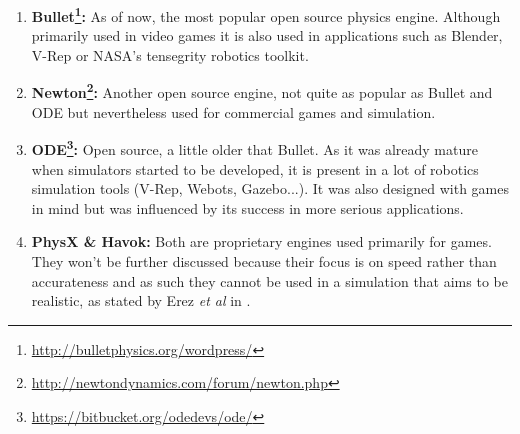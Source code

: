 \begin{enumerate}
\item \textbf{Bullet\footnote{\url{http://bulletphysics.org/wordpress/}}:} As of now, the most popular open source physics engine. Although primarily used in video games it is also used in applications such as Blender, V-Rep or NASA's tensegrity robotics toolkit. 

\item \textbf{Newton\footnote{\url{http://newtondynamics.com/forum/newton.php}}:} Another open source engine, not quite as popular as Bullet and ODE but nevertheless used for commercial games and simulation. 

\item \textbf{ODE\footnote{\url{https://bitbucket.org/odedevs/ode/}}:} Open source, a little older that Bullet. As it was already mature when simulators started to be developed, it is present in a lot of robotics simulation tools (V-Rep, Webots, Gazebo...). It was also designed with games in mind but was influenced by its success in more serious applications.

\item \textbf{PhysX \& Havok:} Both are proprietary engines used primarily for games. They won't be further discussed because their focus is on speed rather than accurateness and as such they cannot be used in a simulation that aims to be realistic, as stated by Erez \textit{et al} in \cite{engines_comparison}.
\end{enumerate}

